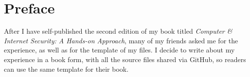 


\chapter*{Preface}


\vspace{0.5in}
\noindent
After I have self-published the second edition of my book titled
\textit{Computer \& Internet Security: A Hands-on Approach}, 
many of my friends asked me for the experience, as well as for 
the template of my files. I decide to write about my experience in 
a book form, with all the source files shared via GitHub, so 
readers can use the same template for their book. 




